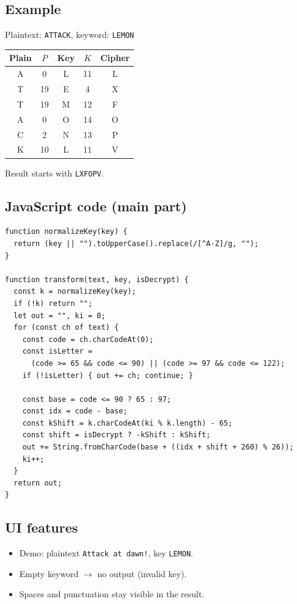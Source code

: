 \documentclass[12pt,a4paper]{article}
\begin{document}
\subsection{Example}
Plaintext: \texttt{ATTACK}, keyword: \texttt{LEMON}

\begin{center}
\begin{tabular}{@{}ccccc@{}}
\toprule
Plain & \(P\) & Key & \(K\) & Cipher \\
\midrule
A & 0 & L & 11 & L \\
T & 19 & E & 4 & X \\
T & 19 & M & 12 & F \\
A & 0 & O & 14 & O \\
C & 2 & N & 13 & P \\
K & 10 & L & 11 & V \\
\bottomrule
\end{tabular}
\end{center}
Result starts with \texttt{LXFOPV}.

\subsection{JavaScript code (main part)}
\begin{lstlisting}
function normalizeKey(key) {
  return (key || "").toUpperCase().replace(/[^A-Z]/g, "");
}

function transform(text, key, isDecrypt) {
  const k = normalizeKey(key);
  if (!k) return "";
  let out = "", ki = 0;
  for (const ch of text) {
    const code = ch.charCodeAt(0);
    const isLetter =
      (code >= 65 && code <= 90) || (code >= 97 && code <= 122);
    if (!isLetter) { out += ch; continue; }

    const base = code <= 90 ? 65 : 97;
    const idx = code - base;
    const kShift = k.charCodeAt(ki % k.length) - 65;
    const shift = isDecrypt ? -kShift : kShift;
    out += String.fromCharCode(base + ((idx + shift + 260) % 26));
    ki++;
  }
  return out;
}
\end{lstlisting}

\subsection{UI features}
\begin{itemize}[leftmargin=*]
  \item Demo: plaintext \texttt{Attack at dawn!}, key \texttt{LEMON}.
  \item Empty keyword \(\rightarrow\) no output (invalid key).
  \item Spaces and punctuation stay visible in the result.
\end{itemize}
\end{document}

